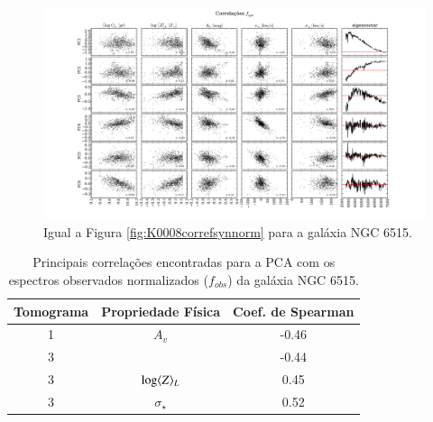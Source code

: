 \begin{figure}
    \includegraphics[width=1.2\textwidth, angle=-90]{figuras/K0864-correl-f_syn_norm-PCvsPhys.pdf}
	\caption[Correlações PCs vs. par\^ametros f\'isicos - $f_{syn}$ - NGC 6515.]
	{Igual a Figura \ref{fig:K0008correfsynnorm} para a galáxia NGC 6515.}
    \label{fig:K0864correfsynnorm}
\end{figure}

\begin{table}
	\caption[Principais correlações - $f_{obs}$ - NGC 6515]
	{Principais correlações encontradas para a PCA com os espectros observados normalizados ($f_{obs}$) da galáxia NGC
	6515.}
	\begin{tabular}{c c c}
		Tomograma & Propriedade Física & Coef. de Spearman \\ 
		\midrule
		1 & $A_v$            & -0.46 \\
		3 & \meanL{\log t}   & -0.44 \\
		3 & $\log \meanL{Z}$ & 0.45 \\
		3 & $\sigma_\star$   & 0.52 \\
		\end{tabular}
	\label{tab:K0864tabcorreobs}
\end{table}

